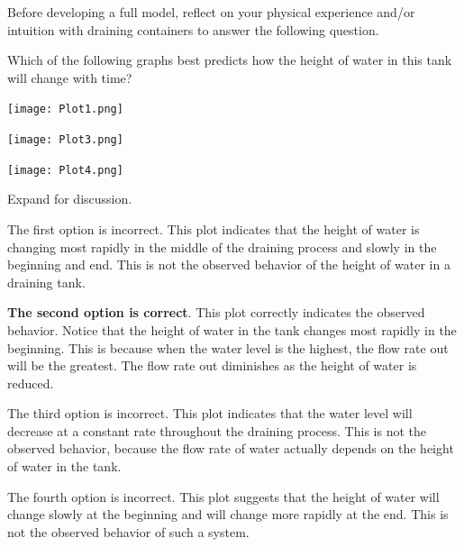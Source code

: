 \documentclass{ximera}
\begin{document}
Before developing a full model, reflect on your physical experience and/or intuition with draining containers to answer the following question.  

\begin{question}\label{quest:guessGraphTank}
Which of the following graphs best predicts how the height of water in this tank will change with time?
 
\begin{multipleChoice}
\choice
{\begin{image}
 \texttt{[image: Plot1.png]}
\end{image}}


\choice
{\begin{image}
 \texttt{[image: Plot3.png]}
\end{image}}

\choice
{\begin{image}
 \texttt{[image: Plot4.png]}
\end{image}}

\end{multipleChoice}



Expand for discussion.
 
\begin{expandable}
    The first option is incorrect.  This plot indicates that the height of water is changing most rapidly in the middle of the draining process and slowly in the beginning and end.  This is not the observed behavior of the height of water in a draining tank.
    
     \textbf{The second option is correct}.  This plot correctly indicates the observed behavior.  Notice that the height of water in the tank changes most rapidly in the beginning.  This is because when the water level is the highest, the flow rate out will be the greatest.  The flow rate out diminishes as the height of water is reduced.
     
     The third option is incorrect.  This plot indicates that the water level will decrease at a constant rate throughout the draining process.  This is not the observed behavior, because the flow rate of water actually depends on the height of water in the tank.
     
     The fourth option is incorrect.  This plot suggests that the height of water will change slowly at the beginning and will change more rapidly at the end.  This is not the observed behavior of such a system.  
     
 \end{expandable}
 
 \end{question}
 
\end{document}
